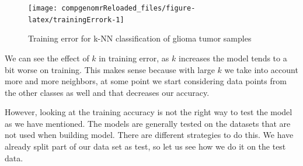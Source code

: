 \documentclass[12pt,]{krantz}
\begin{document}
\begin{figure}

{\centering \texttt{[image: compgenomrReloaded\_files/figure-latex/trainingErrork-1]} 

}

\caption{Training error for k-NN classification of glioma tumor samples}\label{fig:trainingErrork}
\end{figure}

We can see the effect of \(k\) in training error, as \(k\) increases the model tends to a bit worse on training. This makes sense because with large \(k\) we take into account more and more neighbors, at some point we start considering data points from the other classes as well and that decreases our accuracy.

However, looking at the training accuracy is not the right way to test the model as we have mentioned. The models are generally tested on the datasets that are not used when building model. There are different strategies to do this. We have already split part of our data set as test, so let us see how we do it on the test data.
\end{document}

